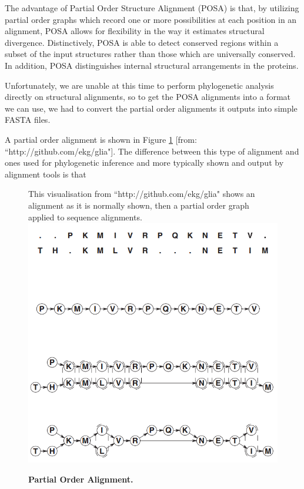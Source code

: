 \documentclass[10pt,letterpaper]{article}
\begin{document}
The advantage of Partial Order Structure Alignment (POSA) is that, by utilizing partial order graphs which record one or more possibilities at each position in an alignment, POSA allows for flexibility in the way it estimates structural divergence. \cite{POSA} 
Distinctively, POSA is able to detect conserved regions within a subset of the input structures rather than those which are universally conserved.  In addition, POSA distinguishes internal structural arrangements in the proteins. \cite{POSA} 


Unfortunately, we are unable at this time to perform phylogenetic analysis directly on structural alignments, so to get the POSA alignments into a format we can use, we had to convert the partial order alignments it outputs into simple FASTA files.

A partial order alignment is shown in Figure \ref{POA} [from: ``http://github.com/ekg/glia"].  The difference between this type of alignment and ones used for phylogenetic inference and more typically shown and output by alignment tools is that

\begin{figure}
  \caption{\bf Partial Order Alignment.} This visualisation from ``http://github.com/ekg/glia" shows an alignment as it is normally shown, then a partial order graph applied to sequence alignments.
  \centering
    \includegraphics[width=\textwidth]{POA.png}
  \label{POA}  
\end{figure}
\end{document}
